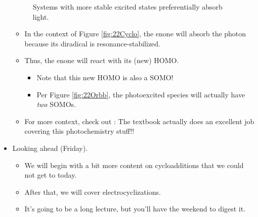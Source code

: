\documentclass[../notes.tex]{subfiles}
\begin{document}
\begin{itemize}
\begin{figure}[h!]
        \caption{Systems with more stable excited states preferentially absorb light.}
        \label{fig:photoStable}
    \end{figure}
    \begin{itemize}
        \item In the context of Figure \ref{fig:22Cyclo}, the enone will absorb the photon because its diradical is resonance-stabilized.
        \item Thus, the enone will react with its (new) HOMO.
        \begin{itemize}
            \item Note that this new HOMO is also a SOMO!
            \item Per Figure \ref{fig:22Orbb}, the photoexcited species will actually have \emph{two} SOMOs.
        \end{itemize}
        \item For more context, check out \textcite{bib:Clayden}: The textbook actually does an excellent job covering this photochemistry stuff!!
    \end{itemize}
    \item Looking ahead (Friday).
    \begin{itemize}
        \item We will begin with a bit more content on cycloadditions that we could not get to today.
        \item After that, we will cover electrocyclizations.
        \item It's going to be a long lecture, but you'll have the weekend to digest it.
    \end{itemize}
\end{itemize}
\end{document}
